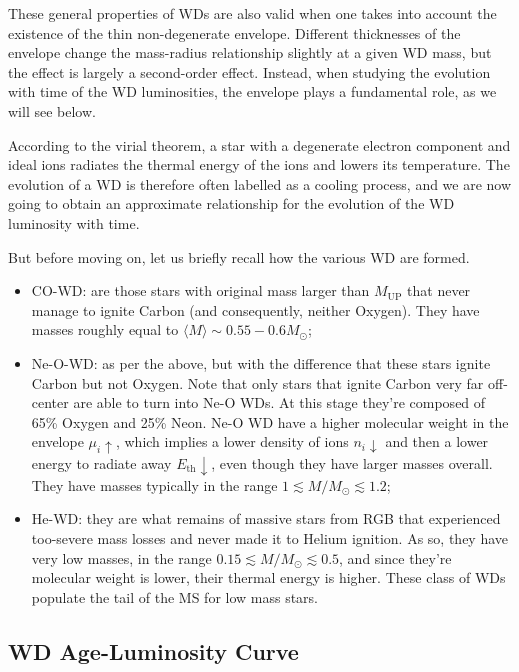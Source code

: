 \par These general properties of WDs are also valid when one takes into account the existence of the thin non-degenerate envelope. Different thicknesses of the envelope change the mass-radius relationship slightly at a given WD mass, but the effect is largely a second-order effect. Instead, when studying the evolution with time of the WD luminosities, the envelope plays a fundamental role, as we will see below.
\par According to the virial theorem, a star with a degenerate electron component and ideal ions radiates the thermal energy of the ions and lowers its temperature. The evolution of a WD is therefore often labelled as a cooling process, and we are now going to obtain an approximate relationship for the evolution of the WD luminosity with time.
\par But before moving on, let us briefly recall how the various WD are formed.
\begin{itemize}
    \item CO-WD: are those stars with original mass larger than $M_{\text{UP}}$ that never manage to ignite Carbon (and consequently, neither Oxygen). They have masses roughly equal to $\langle M \rangle \sim 0.55-0.6M_{\odot}$;
    \item Ne-O-WD: as per the above, but with the difference that these stars ignite Carbon but not Oxygen. Note that only stars that ignite Carbon very far off-center are able to turn into Ne-O WDs. At this stage they're composed of 65\% Oxygen and 25\% Neon. Ne-O WD have a higher molecular weight in the envelope $\mu_{i}\uparrow$, which implies a lower density of ions $n_{i}\downarrow$ and then a lower energy to radiate away $E_{\text{th}}\downarrow$, even though they have larger masses overall. They have masses typically in the range $1 \lesssim M/M_{\odot} \lesssim 1.2$;
    \item He-WD: they are what remains of massive stars from RGB that experienced too-severe mass losses and never made it to Helium ignition. As so, they have very low masses, in the range $0.15 \lesssim M/M_{\odot}\lesssim 0.5$, and since they're molecular weight is lower, their thermal energy is higher. These class of WDs populate the tail of the MS for low mass stars.
\end{itemize}

\subsection{WD Age-Luminosity Curve}

